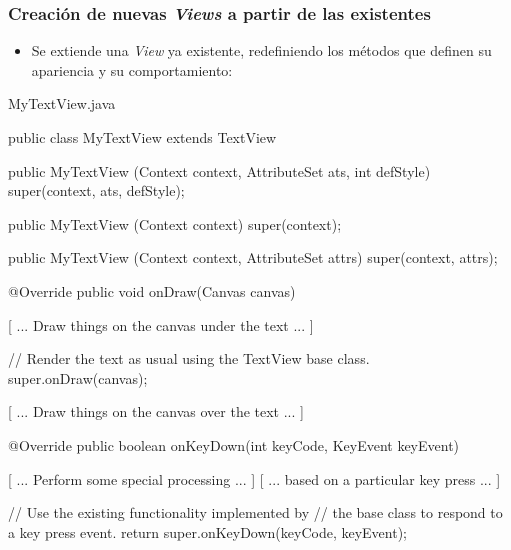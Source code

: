 \documentclass[hyperref={pdfpagelabels=true},ucs]{beamer}
\begin{document}
\begin{frame}[fragile,shrink=25]
\frametitle{Creación de nuevas \emph{Views} a partir de las existentes}

\begin{itemize}
\item Se extiende una \emph{View} ya existente, redefiniendo los
  métodos que definen su apariencia y su comportamiento:
\end{itemize}

\begin{tiny}
\begin{block}{MyTextView.java}
\begin{java}
public class MyTextView extends TextView {
  public MyTextView (Context context, AttributeSet ats, int defStyle) {
    super(context, ats, defStyle);
  }

  public MyTextView (Context context) {
    super(context);
  }

  public MyTextView (Context context, AttributeSet attrs) {
    super(context, attrs);
  }

  @Override
  public void onDraw(Canvas canvas) {
    [ ... Draw things on the canvas under the text ... ]

    // Render the text as usual using the TextView base class.
    super.onDraw(canvas);

    [ ... Draw things on the canvas over the text ... ]
  }

  @Override
  public boolean onKeyDown(int keyCode, KeyEvent keyEvent) {
    [ ... Perform some special processing ... ]
    [ ... based on a particular key press ... ]

    // Use the existing functionality implemented by
    // the base class to respond to a key press event.
    return super.onKeyDown(keyCode, keyEvent);
  }
}
\end{java}
\end{block}
\end{tiny}

\end{frame}
\end{document}
